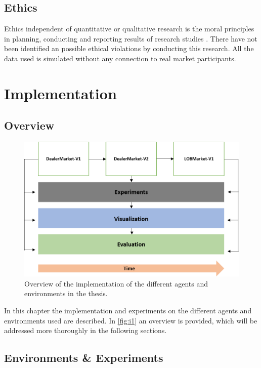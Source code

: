 \documentclass{kththesis}
\theoremstyle{definition}
\begin{document}
\section{Ethics}
Ethics independent of quantitative or qualitative research is the moral principles in planning, conducting and reporting results of research studies \parencite{haakansson2013portal}. There have not been identified an possible ethical violations by conducting this research. All the data used is simulated without any connection to real market participants.

\chapter{Implementation}\label{ch:5}

\section{Overview}
\begin{figure}[H]
    \centering
    \includegraphics[scale=.7]{Imgs/implementation.png}
    \caption{Overview of the implementation of the different agents and environments in the thesis.}
    \label{fig:i1}
\end{figure}
In this chapter the implementation and experiments on the different agents and environments used are described. In \autoref{fig:i1} an overview is provided, which will be addressed more thoroughly in the following sections.

\section{Environments \& Experiments}
\end{document}
